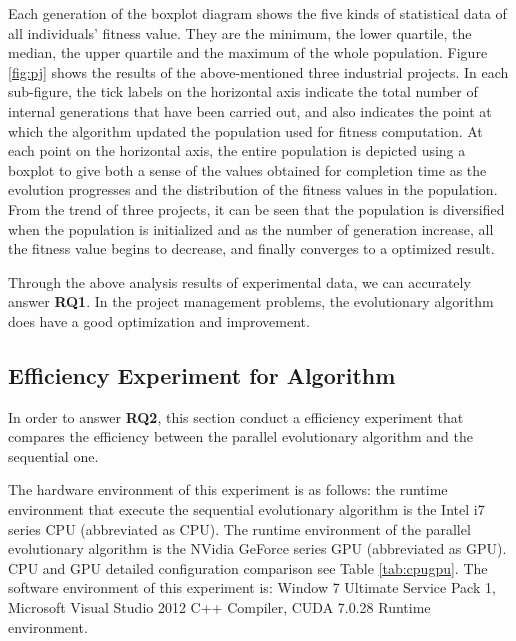 Each generation of the boxplot diagram shows the five kinds of statistical data
of all individuals' fitness value. They are the minimum, the lower quartile, the
median, the upper quartile and the maximum of the whole population. Figure
\ref{fig:pj} shows the results of the above-mentioned three industrial projects.
In each sub-figure, the tick labels on the horizontal axis indicate the total
number of internal generations that have been carried out, and also indicates
the point at which the algorithm updated the population used for fitness
computation. At each point on the horizontal axis, the entire population is
depicted using a boxplot to give both a sense of the values obtained for
completion time as the evolution progresses and the distribution of the fitness
values in the population. From the trend of three projects, it can be seen that
the population is diversified when the population is initialized and as the
number of generation increase, all the fitness value begins to decrease, and
finally converges to a optimized result.


Through the above analysis results of experimental data, we can accurately
answer \textbf{RQ1}. In the project management problems, the evolutionary
algorithm does have a good optimization and improvement.


\subsection{Efficiency Experiment for Algorithm}
%
In order to answer \textbf{RQ2}, this section conduct a efficiency experiment
that compares the efficiency between the parallel evolutionary algorithm and the
sequential one.

The hardware environment of this experiment is as follows: the runtime
environment that execute the sequential evolutionary algorithm is the Intel i7
series CPU (abbreviated as CPU). The runtime environment of the parallel
evolutionary algorithm is the NVidia GeForce series GPU (abbreviated as GPU).
CPU and GPU detailed configuration comparison see Table \ref{tab:cpugpu}. The
software environment of this experiment is: Window 7 Ultimate Service Pack 1,
Microsoft Visual Studio 2012 C++ Compiler, CUDA 7.0.28 Runtime environment.


